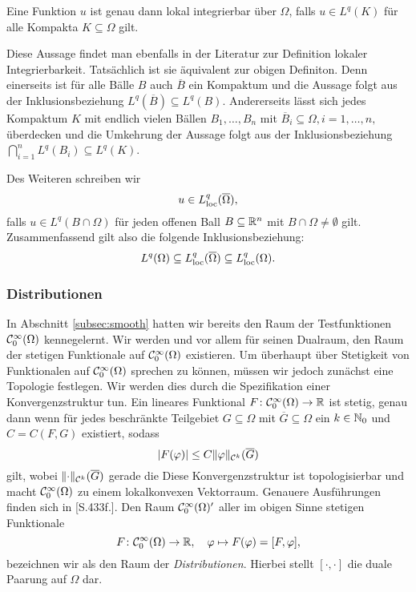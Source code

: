 \begin{bem}
  Eine Funktion $u$ ist genau dann lokal integrierbar über $\Omega$, falls $u \in L^q(K)$ für alle Kompakta $K \subseteq \Omega$ gilt.

  Diese Aussage findet man ebenfalls in der Literatur zur Definition lokaler Integrierbarkeit.
  Tatsächlich ist sie äquivalent zur obigen Definiton.
  Denn einerseits ist für alle Bälle $B$ auch $\overline B$ ein Kompaktum und die Aussage folgt aus der Inklusionsbeziehung $L^q(\overline B) \subseteq L^q(B)$.
  Andererseits lässt sich jedes Kompaktum $K$ mit endlich vielen Bällen $B_1, \dots, B_n$ mit $\overline B_i \subseteq \Omega, i =1,\dots,n,$ überdecken und die Umkehrung der Aussage folgt aus der Inklusionsbeziehung $\bigcap_{i = 1}^n L^q(B_i) \subseteq L^q(K)$.
\end{bem}

Des Weiteren schreiben wir
$$
u \in L^q_{\operatorname{loc}}(\overline\Omega),
$$
falls $u \in L^q(B \cap \Omega)$ für jeden offenen Ball $B \subseteq \mathbb{R}^n$ mit $B \cap \Omega \neq \emptyset$ gilt.
Zusammenfassend gilt also die folgende Inklusionsbeziehung:
$$
L^q(\Omega) \subseteq L^q_{\operatorname{loc}}(\overline\Omega) \subseteq L^q_{\operatorname{loc}}(\Omega).
$$

\subsubsection{Distributionen}

In Abschnitt \ref{subsec:smooth} hatten wir bereits den Raum der Testfunktionen $\mathcal{C}_0^\infty(\Omega)$ kennegelernt.
Wir werden und vor allem für seinen Dualraum, den Raum der stetigen Funktionale auf $\mathcal{C}_0^\infty(\Omega)$ existieren.
Um überhaupt über Stetigkeit von Funktionalen auf $\mathcal{C}_0^\infty(\Omega)$ sprechen zu können, müssen wir jedoch zunächst eine Topologie festlegen.
Wir werden dies durch die Spezifikation einer Konvergenzstruktur tun.
Ein lineares Funktional $F \colon \mathcal{C}_0^\infty(\Omega) \to \mathbb{R}$ ist stetig, genau dann wenn für jedes beschränkte Teilgebiet $G \subseteq \Omega$ mit $\overline G \subseteq \Omega$ ein $k \in \mathbb{N}_0$ und $C = C(F,G)$ existiert, sodass
$$
|F(\varphi)| \leq C \lVert \varphi \rVert_{\mathcal{C}^k}(\overline G)
$$
gilt, wobei $\lVert \cdot \rVert_{\mathcal{C}^k}(\overline G)$ gerade die
Diese Konvergenzstruktur ist topologisierbar und macht $\mathcal{C}_0^\infty(\Omega)$ zu einem lokalkonvexen Vektorraum.
Genauere Ausführungen finden sich in \cite{werner2011fa}[S.433f.].
Den Raum $\mathcal{C}_0^\infty(\Omega)'$ aller im obigen Sinne stetigen Funktionale
$$
F \colon \mathcal{C}_0^\infty(\Omega) \to \mathbb{R}, \quad \varphi \mapsto F(\varphi) = [F, \varphi],
$$
bezeichnen wir als den Raum der \emph{Distributionen}.
Hierbei stellt $[\cdot,\cdot]$ die duale Paarung auf $\Omega$ dar. 

